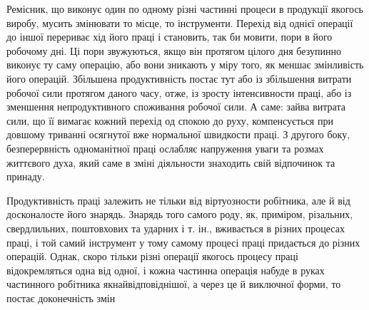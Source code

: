Ремісник, що виконує один по одному різні частинні процеси
в продукції якогось виробу, мусить змінювати то місце, то інструменти. Перехід
від однієї операції до іншої перериває хід його праці і становить, так би
мовити, пори в його робочому дні. Ці пори
звужуються, якщо він протягом цілого дня безупинно
виконує ту саму операцію, або вони зникають у міру того, як
меншає змінливість його операцій. Збільшена продуктивність
постає тут або із збільшення витрати робочої сили протягом
даного часу, отже, із зросту інтенсивности праці, або із зменшення
непродуктивного споживання робочої сили. А саме: зайва витрата
сили, що її вимагає кожний перехід од спокою до руху, компенсується при довшому
триванні осягнутої вже нормальної швидкости
праці. З другого боку, безперервність одноманітної праці ослабляє
напруження уваги та розмах життєвого духа, який саме в зміні
діяльности знаходить свій відпочинок та принаду.

Продуктивність праці залежить не тільки від віртуозности
робітника, але й від досконалосте його знарядь. Знарядь того
самого роду, як, приміром, різальних, свердлильних, поштовхових та ударних і
т. ін., вживається в різних процесах праці, і той самий інструмент у тому
самому процесі праці придається до різних операцій. Однак, скоро тільки різні
операції якогось процесу праці відокремляться одна від одної, і кожна частинна
операція набуде в руках частинного робітника якнайвідповіднішої, а через це й
виключної форми, то постає доконечність змін\parbreak{}
